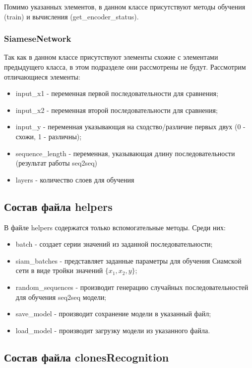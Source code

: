 Помимо указанных элементов, в данном классе присутствуют методы обучения (train) и вычисления (get\_encoder\_status).

\subsubsection{SiameseNetwork}

Так как в данном классе присутствуют элементы схожие с элементами предыдущего класса, в этом подразделе они рассмотрены не будут. Рассмотрим отличающиеся элементы:

\begin{itemize}
\setlength\itemsep{0mm}
\item input\_x1 - переменная первой последовательности для сравнения;
\item input\_x2 - переменная второй последовательности для сравнения;
\item input\_y - переменная указывающая на сходство/различие первых двух (0 - схожи, 1 - различны);
\item sequence\_length - переменная, указывающая длину последовательности (результат работы seq2seq)
\item layers - количество слоев для обучения
\end{itemize}

\subsection{Состав файла helpers}

В файле helpers содержатся только вспомогательные методы. Среди них:

\begin{itemize}
\setlength\itemsep{0mm}
\item batch - создает серии значений из заданной последовательности;
\item siam\_batches - представляет заданные параметры для обучения Сиамской сети в виде тройки значений \(\{x_1, x_2, y\}\);
\item random\_sequences - производит генерацию случайных последовательностей для обучения seq2seq модели;
\item save\_model - производит сохранение модели в указанный файл;
\item load\_model - производит загрузку модели из указанного файла.
\end{itemize}

\subsection{Состав файла clonesRecognition}

